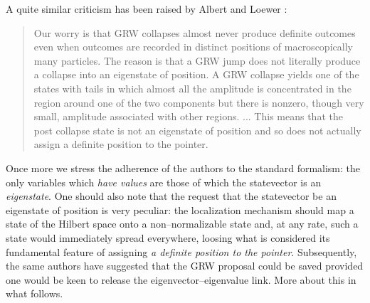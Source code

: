 \documentclass[10pt,a4paper]{article}
\begin{document}
A quite similar criticism has been raised by Albert and Loewer
\cite{alo1}:
\begin{quotation}
Our worry is that GRW collapses almost never produce definite
outcomes even when outcomes are recorded in distinct positions of
macroscopically many particles. The reason is that a GRW jump does
not literally produce a collapse into an eigenstate of position. A
GRW collapse yields one of the states with tails in which almost
all the amplitude is concentrated in the region around one of the
two components but there is nonzero, though very small, amplitude
associated with other regions. ... This means that the post
collapse state is not an eigenstate of position and so does not
actually assign a definite position to the pointer.
\end{quotation}
Once more we stress the adherence of the authors to the standard
formalism: the only variables which {\it have values} are those of
which the statevector is an {\it eigenstate}. One should also note
that the request that the statevector be an eigenstate of position
is very peculiar: the localization mechanism should map a state of
the Hilbert space onto a non--normalizable state and, at any rate,
such a state would immediately spread everywhere, loosing what is
considered its fundamental feature of assigning {\it a definite
position to the pointer}. Subsequently, the same authors
\cite{alo1} have suggested that the GRW proposal could be saved
provided one would be keen to release the eigenvector--eigenvalue
link. More about this in what follows.
\end{document}
